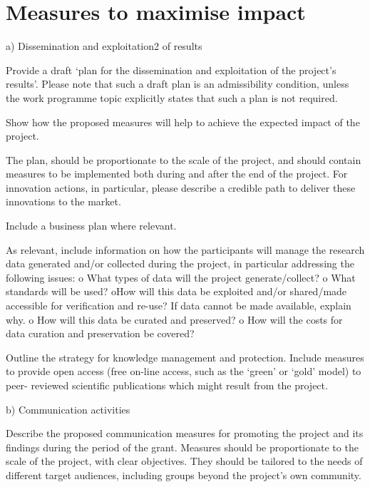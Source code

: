 \section{Measures to maximise impact}

a) Dissemination and exploitation2 of results

Provide a draft ‘plan for the dissemination and exploitation of the project's results’. Please note that such a draft plan is an admissibility condition, unless the work programme topic explicitly states that such a plan is not required.

Show how the proposed measures will help to achieve the expected impact of the project.

The plan, should be proportionate to the scale of the project, and should contain measures to be implemented both during and after the end of the project. For innovation actions, in particular, please describe a credible path to deliver these innovations to the market.

Include a business plan where relevant.

As relevant, include information on how the participants will manage the research data generated and/or collected during the project, in particular addressing the following issues:
o What types of data will the project generate/collect?
o What standards will be used?
oHow will this data be exploited and/or shared/made accessible for verification and re-use? If data cannot be made available, explain why.
o How will this data be curated and preserved?
o How will the costs for data curation and preservation be covered?

Outline the strategy for knowledge management and protection. Include measures to provide open access (free on-line access, such as the ‘green’ or ‘gold’ model) to peer- reviewed scientific publications which might result from the project.

b) Communication activities

Describe the proposed communication measures for promoting the project and its findings during the period of the grant. Measures should be proportionate to the scale of the project, with clear objectives. They should be tailored to the needs of different target audiences, including groups beyond the project's own community.